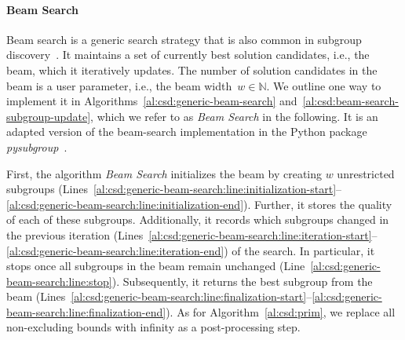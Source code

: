 \documentclass{article}
\theoremstyle{definition}
\begin{document}
\paragraph{Beam Search}

Beam search is a generic search strategy that is also common in subgroup discovery~\cite{atzmueller2005exploiting}.
It maintains a set of currently best solution candidates, i.e., the beam, which it iteratively updates.
The number of solution candidates in the beam is a user parameter, i.e., the beam width~$w \in \mathbb{N}$.
We outline one way to implement it in Algorithms~\ref{al:csd:generic-beam-search} and~\ref{al:csd:beam-search-subgroup-update}, which we refer to as \emph{Beam Search} in the following.
It is an adapted version of the beam-search implementation in the Python package \emph{pysubgroup}~\cite{lemmerich2019pysubgroup}.

First, the algorithm \emph{Beam Search} initializes the beam by creating $w$ unrestricted subgroups (Lines~\ref{al:csd:generic-beam-search:line:initialization-start}--\ref{al:csd:generic-beam-search:line:initialization-end}).
Further, it stores the quality of each of these subgroups.
Additionally, it records which subgroups changed in the previous iteration (Lines~\ref{al:csd:generic-beam-search:line:iteration-start}--\ref{al:csd:generic-beam-search:line:iteration-end}) of the search.
In particular, it stops once all subgroups in the beam remain unchanged (Line~\ref{al:csd:generic-beam-search:line:stop}).
Subsequently, it returns the best subgroup from the beam (Lines~\ref{al:csd:generic-beam-search:line:finalization-start}--\ref{al:csd:generic-beam-search:line:finalization-end}).
As for Algorithm~\ref{al:csd:prim}, we replace all non-excluding bounds with infinity as a post-processing step.
\end{document}
